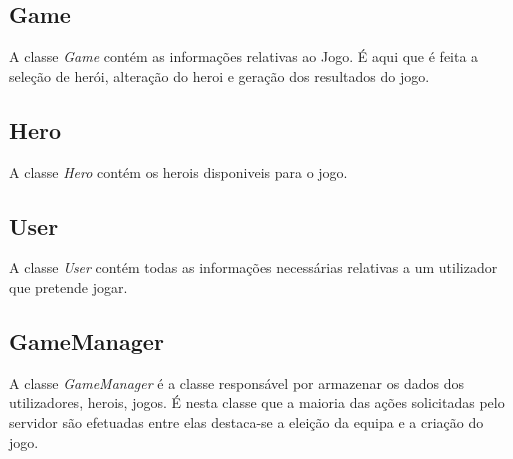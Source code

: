 \subsection{Game}
A classe \textit{Game} contém as informações relativas ao Jogo. É aqui que é feita a seleção de herói, alteração do heroi e geração dos resultados do jogo. 

\subsection{Hero}
A classe \textit{Hero} contém os herois disponiveis para o jogo. 

\subsection{User}
A classe \textit{User} contém todas as informações necessárias relativas a um utilizador que pretende jogar. 

\subsection{GameManager}
A classe \textit{GameManager} é a classe responsável por armazenar os dados dos utilizadores, herois, jogos. É nesta classe que a maioria das ações solicitadas pelo servidor são efetuadas entre elas destaca-se a eleição da equipa e a criação do jogo. 